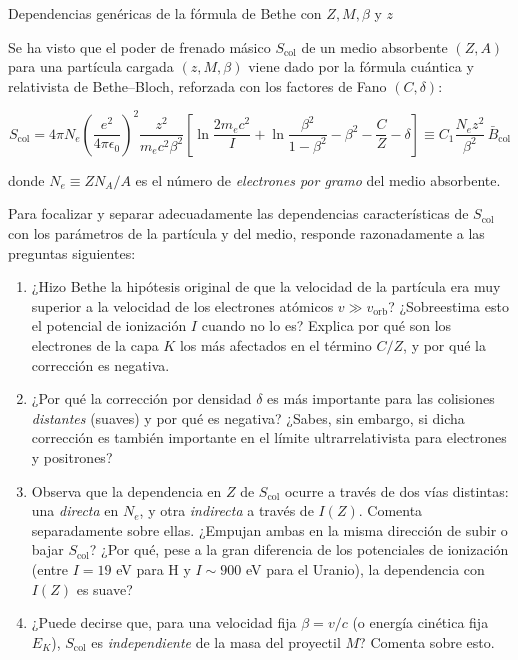 \begin{Ejercicio}{Dependencias genéricas de la fórmula de Bethe con $Z, M, \beta$ y $z$} \label{Ej:02.04}
    

Se ha visto que el poder de frenado másico $S_\text{col}$ de un medio absorbente $(Z,A)$ para una 
partícula cargada $(z, M, \beta)$ viene dado por la fórmula cuántica y relativista de Bethe--Bloch, 
reforzada con los factores de Fano $(C,\delta)$:

\[
S_\text{col} = 4\pi N_e \left( \frac{e^2}{4\pi \epsilon_0} \right)^2 
\frac{z^2}{m_e c^2 \beta^2} 
\left[ \ln \frac{2 m_e c^2}{I} + \ln \frac{\beta^2}{1 - \beta^2} - \beta^2 - \frac{C}{Z} - \delta \right]
\equiv C_1 \frac{N_e z^2}{\beta^2} \, \bar{B}_\text{col}
\]

donde $N_e \equiv ZN_A/A$ es el número de \emph{electrones por gramo} del medio absorbente.  

Para focalizar y separar adecuadamente las dependencias características de $S_\text{col}$ con los 
parámetros de la partícula y del medio, responde razonadamente a las preguntas siguientes:

\begin{enumerate}[label=\alph*)]

\item ¿Hizo Bethe la hipótesis original de que la velocidad de la partícula era muy superior a la 
velocidad de los electrones atómicos $v \gg v_\text{orb}$?  
¿Sobreestima esto el potencial de ionización $I$ cuando no lo es?  
Explica por qué son los electrones de la capa $K$ los más afectados en el término $C/Z$, y por qué la corrección es negativa.

\item ¿Por qué la corrección por densidad $\delta$ es más importante para las colisiones 
\emph{distantes} (suaves) y por qué es negativa?  
¿Sabes, sin embargo, si dicha corrección es también importante en el límite ultrarrelativista para electrones y positrones?

\item Observa que la dependencia en $Z$ de $S_\text{col}$ ocurre a través de dos vías distintas: 
una \emph{directa} en $N_e$, y otra \emph{indirecta} a través de $I(Z)$.  
Comenta separadamente sobre ellas.  
¿Empujan ambas en la misma dirección de subir o bajar $S_\text{col}$?  
¿Por qué, pese a la gran diferencia de los potenciales de ionización (entre $I=19$ eV para H y $I\sim 900$ eV para el Uranio), la dependencia con $I(Z)$ es suave?

\item ¿Puede decirse que, para una velocidad fija $\beta = v/c$ (o energía cinética fija $E_K$), 
$S_\text{col}$ es \emph{independiente} de la masa del proyectil $M$?  
Comenta sobre esto.


\end{enumerate}
\end{Ejercicio}
